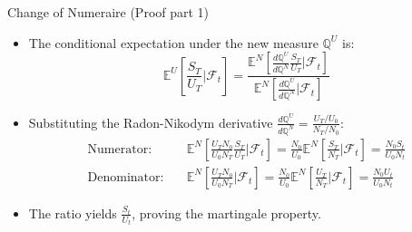 \documentclass{beamer}
\begin{document}
	\begin{frame}{Change of Numeraire (Proof part 1)}
		\begin{itemize}
			\item The conditional expectation under the new measure $\mathbb{Q}^U$ is:
			\begin{equation*}
				\mathbb{E}^U \left[ \frac{S_T}{U_T} \bigg| \mathcal{F}_t \right] = \frac{\mathbb{E}^N \left[ \frac{d\mathbb{Q}^U}{d\mathbb{Q}^N} \frac{S_T}{U_T} \bigg| \mathcal{F}_t \right]}{\mathbb{E}^N \left[ \frac{d\mathbb{Q}^U}{d\mathbb{Q}^N} \bigg| \mathcal{F}_t \right]}
			\end{equation*}
			\item Substituting the Radon-Nikodym derivative $\frac{d\mathbb{Q}^U}{d\mathbb{Q}^N} = \frac{U_T / U_0}{N_T / N_0}$:
			\begin{align*}
				\text{Numerator:} \quad & \mathbb{E}^N \left[ \frac{U_T N_0}{U_0 N_T} \frac{S_T}{U_T} \bigg| \mathcal{F}_t \right] = \frac{N_0}{U_0} \mathbb{E}^N \left[ \frac{S_T}{N_T} \bigg| \mathcal{F}_t \right] = \frac{N_0 S_t}{U_0 N_t} \\
				\text{Denominator:} \quad & \mathbb{E}^N \left[ \frac{U_T N_0}{U_0 N_T} \bigg| \mathcal{F}_t \right] = \frac{N_0}{U_0} \mathbb{E}^N \left[ \frac{U_T}{N_T} \bigg| \mathcal{F}_t \right] = \frac{N_0 U_t}{U_0 N_t}
			\end{align*}
			\item The ratio yields $\frac{S_t}{U_t}$, proving the martingale property.
		\end{itemize}
		\myendproof
	\end{frame}
\end{document}
